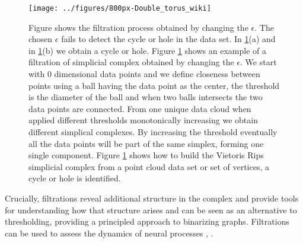 \documentclass[onecollarge,runningheads]{svjour2}
\begin{document}
\begin{figure}[h]
        \centering
        \texttt{[image: ../figures/800px-Double\_torus\_wiki]}
        \caption{Figure shows the filtration process obtained by changing the $\epsilon$.
        The chosen $\epsilon$ fails to detect the cycle or hole in the data set. In \ref{fig:whyweneedfiltration}(a) and in \ref{fig:whyweneedfiltration}(b) we obtain a cycle or hole. Figure \ref{fig:whyweneedfiltration} shows an example of a filtration of simplicial complex obtained by changing the $\epsilon$. We start with 0 dimensional data points and we define closeness between points using a ball having the data point as the center, the threshold is the diameter of the ball and when two balls intersects the two data points are connected. From one unique data cloud when applied different thresholds monotonically increasing we obtain different simplical complexes. By increasing the threshold eventually all the data points will be part of the same simplex, forming one single component. Figure \ref{fig:whyweneedfiltration} shows how to build the Vietoris Rips simplicial complex from a point cloud data set or set of vertices, a cycle or hole is identified.}
\label{fig:whyweneedfiltration}
\end{figure}

Crucially, filtrations reveal additional structure in the complex and provide tools for understanding how that structure arises and can be seen as an alternative to thresholding, providing a principled approach to binarizing graphs. Filtrations can be used to assess the dynamics of neural processes \cite{kim2014morphological}, \cite{giusti2016two}.
\end{document}
